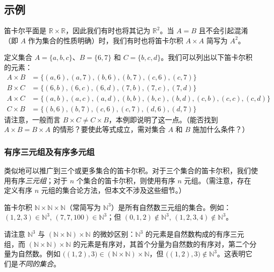 \subsection{示例}

笛卡尔平面是 $\mathbb{R} \times \mathbb{R}$，因此我们有时也将其记为 $\mathbb{R}^2$。当 $A = B$ 且不会引起混淆（即 $A$ 作为集合的性质明确）时，我们有时也将笛卡尔积 $A \times A$ 简写为 $A^2$。

\begin{example}
    定义集合 $A = \{a, b, c\}$、$B = \{6, 7\}$ 和 $C = \{b, c, d\}$。我们可以列出以下笛卡尔积的元素：
    \begin{align*}
        A \times B &= \{(a, 6),(a, 7),(b, 6),(b, 7),(c, 6),(c, 7)\} \\
        B \times C &= \{(6, b),(6, c),(6, d),(7, b),(7, c),(7, d)\} \\
        A \times C &= \{(a, b),(a, c),(a, d),(b, b),(b, c),(b, d),(c, b),(c, c),(c, d)\} \\
        C \times B &= \{(b, 6),(b, 7),(c, 6),(c, 7),(d, 6),(d, 7)\}
    \end{align*}
    请注意，一般而言 $B \times C \ne C \times B$，本例即说明了这一点。（能否找到 $A \times B = B \times A$ 的情形？要使此等式成立，需对集合 $A$ 和 $B$ 施加什么条件？）
\end{example}

\subsubsection*{有序三元组及有序多元组}

类似地可以推广到三个或更多集合的笛卡尔积。对于三个集合的笛卡尔积，我们使用有序\emph{三元组}；对于 $n$ 个集合的笛卡尔积，则使用有序 $n$ 元组。（需注意，存在定义有序 $n$ 元组的集合论方法，但本文不涉及这些细节。）

\begin{example}
    笛卡尔积 $\mathbb{N} \times \mathbb{N} \times \mathbb{N}$（常简写为 $\mathbb{N}^3$）是所有自然数三元组的集合。例如：$(1, 2, 3) \in \mathbb{N}^3$, $(7, 7, 100) \in \mathbb{N}^3$；但 $(0, 1, 2) \notin \mathbb{N}^3$, $(1, 2, 3, 4) \notin \mathbb{N}^3$。
\end{example}

请注意 $\mathbb{N}^3$ 与 $(\mathbb{N} \times \mathbb{N}) \times \mathbb{N}$ 的微妙区别：$\mathbb{N}^3$ 的元素是自然数构成的有序三元组，而 $(\mathbb{N} \times \mathbb{N}) \times \mathbb{N}$ 的元素是有序对，其首个分量为自然数的有序对，第二个分量为自然数。例如 $\big((1, 2), 3\big) \in (\mathbb{N} \times \mathbb{N}) \times \mathbb{N}$，但 $\big((1, 2), 3\big) \notin \mathbb{N}^3$。这表明它们是\emph{不同的集合}。

